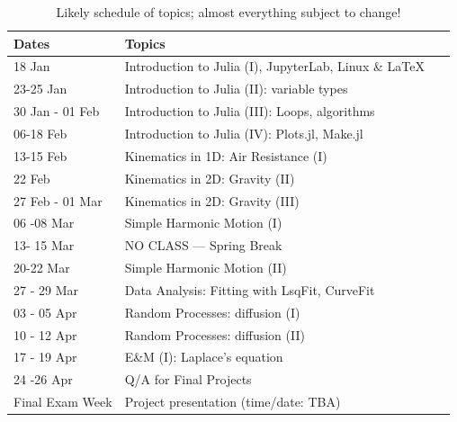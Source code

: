 \documentclass[justified]{tufte-handout}
\begin{document}
\begin{table}[h]
  \centering
  \selectfont
  \begin{tabular}{lll}  
    \toprule
    Dates &  Topics  \\
    \midrule
    18 Jan	         	& Introduction to Julia (I), JupyterLab, Linux \& \LaTeX\   \\
    23-25 Jan      	& Introduction to Julia (II): variable types				\\    
   30 Jan - 01 Feb 	& Introduction to Julia (III): Loops, algorithms		 \\
    06-18 Feb      	& Introduction to Julia (IV): Plots.jl, Make.jl		\\
    13-15 Feb  		& Kinematics in 1D: Air Resistance (I)      			\\
    22 Feb		  	& Kinematics in 2D: Gravity (II)           			\\
   27 Feb - 01 Mar     	& Kinematics in 2D: Gravity (III)       				 \\
    06 -08 Mar      	& Simple Harmonic Motion (I)            			\\
    13- 15 Mar		& NO CLASS --- Spring Break 					\\
    20-22 Mar      	& Simple Harmonic Motion (II)           			\\
    27 - 29 Mar   	& Data Analysis: Fitting with LsqFit, CurveFit 		 \\
    03 - 05 Apr      	& Random Processes: diffusion (I)				\\
    10 - 12 Apr      	& Random Processes: diffusion	 (II)				\\
    17 - 19 Apr      	& E\&M (I): Laplace's equation					\\
    24 -26 Apr      	&Q/A for Final Projects	 					\\
    Final Exam Week  & Project presentation (time/date: TBA)			\\
  \bottomrule
  \end{tabular}
  \caption{Likely schedule of topics; almost everything subject  to change!}
  \label{tab:normaltab}
\end{table}
\end{document}
